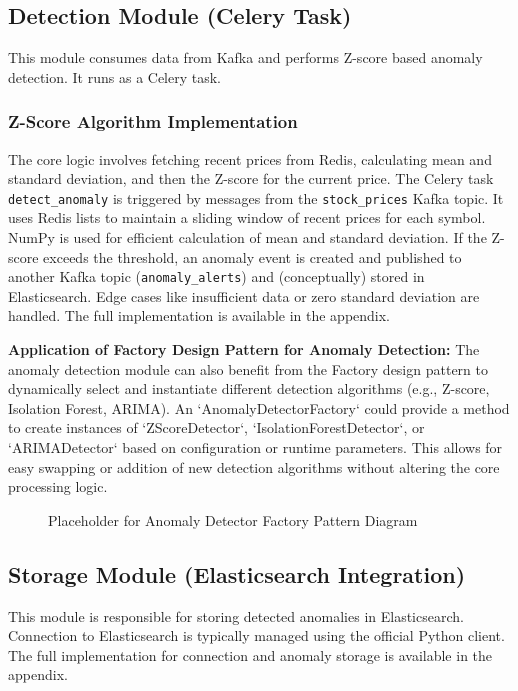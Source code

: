 \subsection{Detection Module (Celery Task)}

This module consumes data from Kafka and performs Z-score based anomaly detection. It runs as a Celery task.

\subsubsection{Z-Score Algorithm Implementation}
The core logic involves fetching recent prices from Redis, calculating mean and standard deviation, and then the Z-score for the current price. The Celery task \texttt{detect\_anomaly} is triggered by messages from the \texttt{stock\_prices} Kafka topic. It uses Redis lists to maintain a sliding window of recent prices for each symbol. NumPy is used for efficient calculation of mean and standard deviation. If the Z-score exceeds the threshold, an anomaly event is created and published to another Kafka topic (\texttt{anomaly\_alerts}) and (conceptually) stored in Elasticsearch. Edge cases like insufficient data or zero standard deviation are handled. The full implementation is available in the appendix.

\textbf{Application of Factory Design Pattern for Anomaly Detection:}
The anomaly detection module can also benefit from the Factory design pattern to dynamically select and instantiate different detection algorithms (e.g., Z-score, Isolation Forest, ARIMA). An `AnomalyDetectorFactory` could provide a method to create instances of `ZScoreDetector`, `IsolationForestDetector`, or `ARIMADetector` based on configuration or runtime parameters. This allows for easy swapping or addition of new detection algorithms without altering the core processing logic.
\begin{figure}[h!]
    \centering
    \caption{Placeholder for Anomaly Detector Factory Pattern Diagram}
    \label{fig:anomaly_detector_factory_diagram}
\end{figure}

\subsection{Storage Module (Elasticsearch Integration)}

This module is responsible for storing detected anomalies in Elasticsearch. Connection to Elasticsearch is typically managed using the official Python client. The full implementation for connection and anomaly storage is available in the appendix.

